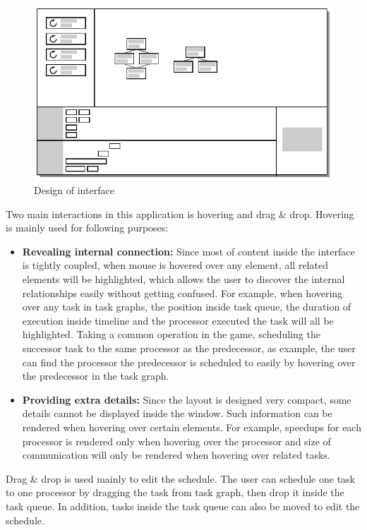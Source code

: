 \documentclass[msc,deptreport, cs]{infthesis}
\begin{document}
\begin{figure}[!htb]
  \centering
  \includegraphics[width=0.8\columnwidth]{layout.pdf}
  \caption{Design of interface}
  \label{fig:layout}
\end{figure}

Two main interactions in this application is hovering and drag \& drop. Hovering is mainly used for following purposes:

\begin{itemize}
  \item \textbf{Revealing internal connection:} Since most of content inside the interface is tightly coupled, when mouse is hovered over any element, all related elements will be highlighted, which allows the user to discover the internal relationships easily without getting confused. For example, when hovering over any task in task graphs, the position inside task queue, the duration of execution inside timeline and the processor executed the task will all be highlighted. Taking a common operation in the game, scheduling the successor task to the same processor as the predecessor, as example, the user can find the processor the predecessor is scheduled to easily by hovering over the predecessor in the task graph.
  \item \textbf{Providing extra details:} Since the layout is designed very compact, some details cannot be displayed inside the window. Such information can be rendered when hovering over certain elements. For example, speedups for each processor is rendered only when hovering over the processor and size of communication will only be rendered when hovering over related tasks.
\end{itemize}

Drag \& drop is used mainly to edit the schedule. The user can schedule one task to one processor by dragging the task from task graph, then drop it inside the task queue. In addition, tasks inside the task queue can also be moved to edit the schedule.
\end{document}
